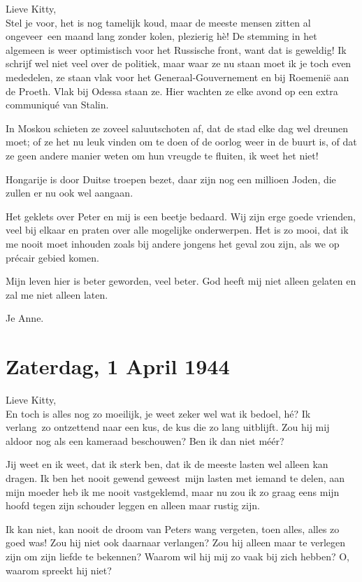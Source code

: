 \documentclass{book}
\begin{document}
Lieve Kitty,\\
Stel je voor, het is nog tamelijk koud, maar de meeste mensen
zitten al ongeveer~een maand lang zonder kolen, plezierig hè! De stemming in het
algemeen is weer optimistisch voor het Russische front, want dat is geweldig! Ik
schrijf wel niet veel over de politiek, maar waar ze nu staan moet ik je toch
even mededelen, ze staan vlak voor het Generaal-Gouvernement en bij Roemenië aan
de Proeth. Vlak bij Odessa staan ze. Hier wachten ze elke avond op een extra
communiqué van Stalin.

In Moskou schieten ze zoveel saluutschoten af, dat de stad elke dag wel dreunen
moet; of ze het nu leuk vinden om te doen of de oorlog weer in de buurt is, of
dat ze geen andere manier weten om hun vreugde te fluiten, ik weet het niet!

Hongarije is door Duitse troepen bezet, daar zijn nog een millioen Joden, die
zullen er nu ook wel aangaan.

Het geklets over Peter en mij is een beetje bedaard. Wij zijn erge goede
vrienden, veel bij elkaar en praten over alle mogelijke onderwerpen. Het is zo
mooi, dat ik me nooit moet inhouden zoals bij andere jongens het geval zou zijn,
als we op précair gebied komen.

Mijn leven hier is beter geworden, veel beter. God heeft mij niet alleen gelaten
en zal me niet alleen laten.

Je Anne.

\section*{Zaterdag, 1 April 1944}

Lieve Kitty,\\
En toch is alles nog zo moeilijk, je weet zeker wel wat ik
bedoel, hé? Ik verlang~zo ontzettend naar een kus, de kus die zo lang uitblijft.
Zou hij mij aldoor nog als een kameraad beschouwen? Ben ik dan niet méér?

Jij weet en ik weet, dat ik sterk ben, dat ik de meeste lasten wel alleen kan
dragen. Ik ben het nooit gewend geweest~mijn lasten met iemand te delen, aan
mijn moeder heb ik me nooit vastgeklemd, maar nu zou ik zo graag eens mijn hoofd
tegen zijn schouder leggen en alleen maar rustig zijn.

Ik kan niet, kan nooit de droom van Peters wang vergeten, toen alles, alles zo
goed was! Zou hij niet ook daarnaar verlangen? Zou hij alleen maar te verlegen
zijn om zijn liefde te bekennen? Waarom wil hij mij zo vaak bij zich hebben? O,
waarom spreekt hij niet?
\end{document}
